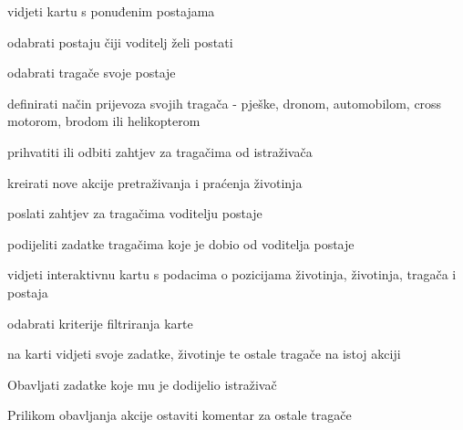 			
			\begin{packed_enum}
				\item  {}
				
				\begin{packed_enum}
					
					\item vidjeti kartu s ponuđenim postajama
					\item odabrati postaju čiji voditelj želi postati
					\item odabrati tragače svoje postaje
					\item definirati način prijevoza svojih tragača - pješke, dronom, automobilom, cross motorom, brodom ili helikopterom
					\item prihvatiti ili odbiti zahtjev za tragačima od istraživača
					
				\end{packed_enum}
			
				\item  {}
				
				\begin{packed_enum}
					
					\item kreirati nove akcije pretraživanja i praćenja životinja
					\item poslati zahtjev za tragačima voditelju postaje
					\item podijeliti zadatke tragačima koje je dobio od voditelja postaje
					\item vidjeti interaktivnu kartu s podacima o pozicijama životinja, životinja, tragača i postaja
					\item odabrati kriterije filtriranja karte
					
				\end{packed_enum}
				
				\item  {}
				
				\begin{packed_enum}
					
					\item na karti vidjeti svoje zadatke, životinje te ostale tragače na istoj akciji
					\item Obavljati zadatke koje mu je dodijelio istraživač
					\item Prilikom obavljanja akcije ostaviti komentar za ostale tragače
					
				\end{packed_enum}
				
				
			\end{packed_enum}
			
